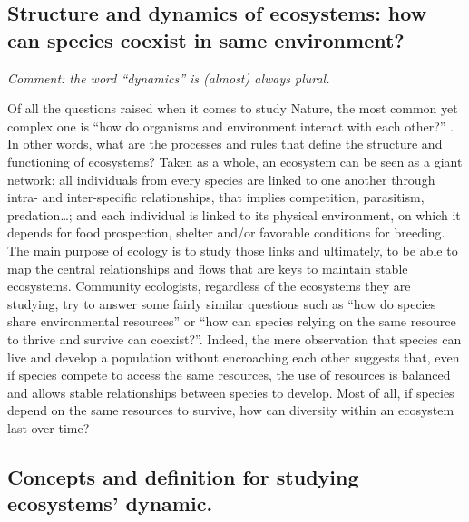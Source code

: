 

\subsection{Structure and dynamics of ecosystems: how can species coexist in same environment?} 

\emph{Comment: the word ``dynamics'' is (almost) always plural.}

Of all the questions raised when it comes to study Nature, the most common yet complex one is ``how do organisms and environment interact with each other?'' \citep{sutherland2013}. In other words, what are the processes and rules that define the structure and functioning of ecosystems? Taken as a whole, an ecosystem can be seen as a giant network: all individuals from every species are linked to one another through intra- and inter-specific relationships, that implies competition, parasitism, predation\ldots{}; and each individual is linked to its physical environment, on which it depends for food prospection, shelter and/or favorable conditions for breeding. The main purpose of ecology is to study those links and ultimately, to be able to map the central relationships and flows that are keys to maintain stable ecosystems. Community ecologists, regardless of the ecosystems they are studying, try to answer some fairly similar questions such as ``how do species share environmental resources'' or ``how can species relying on the same resource to thrive and survive can coexist?''. Indeed, the mere observation that species can live and develop a population without encroaching each other suggests that, even if species compete to access the same resources, the use of resources is balanced and allows stable relationships between species to develop. Most of all, if species depend on the same resources to survive, how can diversity within an ecosystem last over time?

\subsection{Concepts and definition for studying ecosystems’ dynamic.}
 
